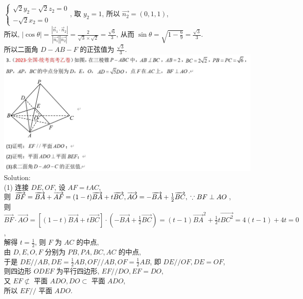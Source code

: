\documentclass[a4paper,11pt,UTF8]{article}
\begin{document}
$\left\{\begin{array}{l}\sqrt{2} y_2-\sqrt{2} z_2=0 \\ -\sqrt{2} x_2=0\end{array}\right.$, 取 $y_2=1$, 所以 $\overrightarrow{n_2}=(0,1,1)$,\\
所以, $\displaystyle|\cos \theta|=\frac{\left|\vec{n}_1 \cdot \vec{n}_2\right|}{\left|\overrightarrow{n_1}\right|\left|\overrightarrow{n_2}\right|}=\frac{2}{\sqrt{3} \times \sqrt{2}}=\frac{\sqrt{6}}{3}$, 从而 $\sin \theta=\sqrt{1-\frac{6}{9}}=\frac{\sqrt{3}}{3}$.\\
所以二面角 $D-A B-F$ 的正弦值为 $\displaystyle\frac{\sqrt{3}}{3}$.\\
\includegraphics[scale=0.5]{./2023_yi.jpg}\\
Solution:\\
(1) 连接 $D E, O F$, 设 $A F=t A C$, \\
则 $\overrightarrow{B F}=\overrightarrow{B A}+\overrightarrow{A F}=(1-t) \overrightarrow{B A}+t \overrightarrow{B C}, \overrightarrow{A O}=-\overrightarrow{B A}+\frac{1}{2} \overrightarrow{B C},\\ \because B F \perp A O$, \\则 $\overrightarrow{B F} \cdot \overrightarrow{A O}=[(1-t) \overrightarrow{B A}+t \overrightarrow{B C}] \cdot\left(-\overrightarrow{B A}+\frac{1}{2} \overrightarrow{B C}\right)=(t-1) \overrightarrow{B A}^2+\frac{1}{2} t \overrightarrow{B C^2}=4(t-1)+4 t=0$,\\ 解得 $t=\frac{1}{2}$, 则 $F$ 为 $A C$ 的中点,\\ 由 $D, E, O, F$ 分别为 $P B, P A, B C, A C$ 的中点,\\ 于是 $D E / / A B, D E=\frac{1}{2} A B, O F / / A B, O F=\frac{1}{2} A B$, 即 $D E / / O F, D E=O F$,\\ 则四边形 $O D E F$ 为平行四边形, $E F / / D O, E F=D O$,\\ 又 $E F \not \subset$ 平面 $A D O, D O \subset$ 平面 $A D O$,\\ 所以 $E F / /$ 平面 $A D O$.\\
\end{document}

